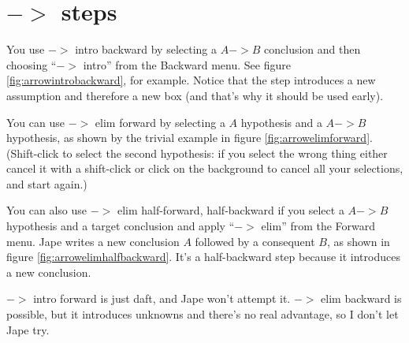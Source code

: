 \documentclass[11pt]{book}
\newcommand{\figref}[1]{figure \ref{fig:#1}}
\begin{document}
\section{$->$ steps}

You use $->$ intro backward by selecting a $A->B$ conclusion and then choosing ``$->$ intro'' from the Backward menu. See \figref{arrowintrobackward}, for example. Notice that the step introduces a new assumption and therefore a new box (and that's why it should be used early).

You can use $->$ elim forward by selecting a $A$ hypothesis and a $A->B$ hypothesis, as shown by the trivial example in \figref{arrowelimforward}. (Shift-click to select the second hypothesis: if you select the wrong thing either cancel it with a shift-click or click on the background to cancel all your selections, and start again.)

You can also use $->$ elim half-forward, half-backward if you select a $A->B$ hypothesis and a target conclusion and apply ``$->$ elim'' from the Forward menu. Jape writes a new conclusion $A$ followed by a consequent $B$, as shown in \figref{arrowelimhalfbackward}. It's a half-backward step because it introduces a new conclusion.

$->$ intro forward is just daft, and Jape won't attempt it. $->$ elim backward is possible, but it introduces unknowns and there's no real advantage, so I don't let Jape try.
 
\end{document}
